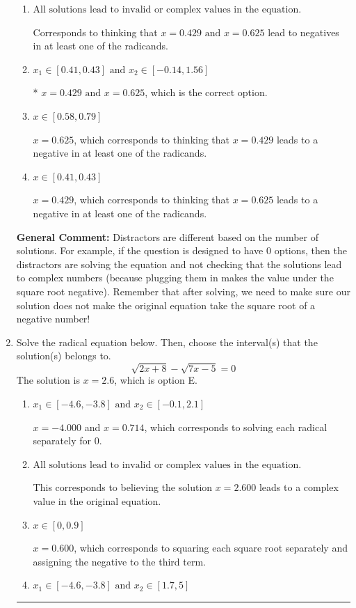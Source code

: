 \documentclass{extbook}[14pt]
\newcommand{\litem}[1]{\item #1

\rule{\textwidth}{0.4pt}}
\begin{document}
\begin{enumerate}
{\begin{enumerate}[label=\Alph*.]
$x = -0.625 \text{ and } x = -0.429$, which are the negative or absolute values of the values you would have gotten by solving the equation correctly.
\item \( \text{All solutions lead to invalid or complex values in the equation.} \)

Corresponds to thinking that $x = 0.429 \text{ and } x = 0.625$ lead to negatives in at least one of the radicands.
\item \( x_1 \in [0.41, 0.43] \text{ and } x_2 \in [-0.14,1.56] \)

* $x = 0.429 \text{ and } x = 0.625$, which is the correct option.
\item \( x \in [0.58,0.79] \)

$x = 0.625$, which corresponds to thinking that $x = 0.429$ leads to a negative in at least one of the radicands.
\item \( x \in [0.41,0.43] \)

$x = 0.429$, which corresponds to thinking that $x = 0.625$ leads to a negative in at least one of the radicands.
\end{enumerate}

\textbf{General Comment:} Distractors are different based on the number of solutions. For example, if the question is designed to have 0 options, then the distractors are solving the equation and not checking that the solutions lead to complex numbers (because plugging them in makes the value under the square root negative). Remember that after solving, we need to make sure our solution does not make the original equation take the square root of a negative number!
}
\litem{
Solve the radical equation below. Then, choose the interval(s) that the solution(s) belongs to.
\[ \sqrt{2 x + 8} - \sqrt{7 x - 5} = 0 \]The solution is \( x = 2.6 \), which is option E.\begin{enumerate}[label=\Alph*.]
\item \( x_1 \in [-4.6, -3.8] \text{ and } x_2 \in [-0.1,2.1] \)

$x = -4.000$ and $x = 0.714$, which corresponds to solving each radical separately for 0.
\item \( \text{All solutions lead to invalid or complex values in the equation.} \)

This corresponds to believing the solution $x = 2.600$ leads to a complex value in the original equation.
\item \( x \in [0,0.9] \)

$x = 0.600$, which corresponds to squaring each square root separately and assigning the negative to the third term.
\item \( x_1 \in [-4.6, -3.8] \text{ and } x_2 \in [1.7,5] \)


\end{enumerate}}
\end{enumerate}
\end{document}
